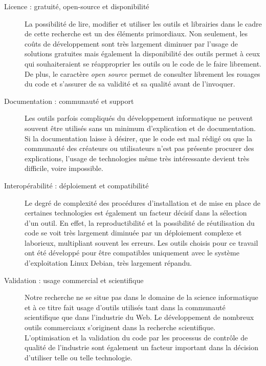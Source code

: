     \begin{description}
        \item[Licence : gratuité, open-source et disponibilité]
            La possibilité de lire, modifier et utiliser les outils et librairies dans le cadre de cette recherche est un des éléments primordiaux. Non seulement, les coûts de développement sont très largement diminuer par l'usage de solutions gratuites mais également la disponibilité des outils permet à ceux qui souhaiteraient se réapproprier les outils ou le code de le faire librement. De plus, le caractère \textit{open source} permet de consulter librement les rouages du code et s'assurer de sa validité et sa qualité avant de l'invoquer.

        \item[Documentation : communauté et support]
            Les outils parfois compliqués du développement informatique ne peuvent souvent être utilisés sans un minimum d'explication et de documentation. Si la documentation laisse à désirer, que le code est mal rédigé ou que la communauté des créateurs ou utilisateurs n'est pas présente procurer des explications, l'usage de technologies même très intéressante devient très difficile, voire impossible.

        \item[Interopérabilité : déploiement et compatibilité]
            Le degré de complexité des procédures d'installation et de mise en place de certaines technologies est également un facteur décisif dans la sélection d'un outil. En effet, la reproductibilité et la possibilité de réutilisation du code se voit très largement diminuée par un déploiement complexe et laborieux, multipliant souvent les erreurs. Les outils choisis pour ce travail ont été développé pour être compatibles uniquement avec le système d'exploitation Linux Debian, très largement répandu.

        \item[Validation : usage commercial et scientifique]
            Notre recherche ne se situe pas dans le domaine de la science informatique et à ce titre fait usage d'outils utilisés tant dans la communauté scientifique que dans l'industrie du Web. Le développement de nombreux  outils commerciaux s'originent dans la recherche scientifique. L'optimisation et la validation du code par les processus de contrôle de qualité de l'industrie sont également un facteur important dans la décision d'utiliser telle ou telle technologie.
    \end{description}

